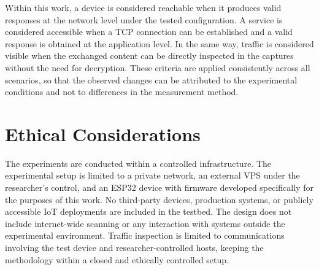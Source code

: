 Within this work, a device is considered reachable when it produces valid responses at the network level under the tested configuration. A service is considered accessible when a TCP connection can be established and a valid response is obtained at the application level. In the same way, traffic is considered visible when the exchanged content can be directly inspected in the captures without the need for decryption. These criteria are applied consistently across all scenarios, so that the observed changes can be attributed to the experimental conditions and not to differences in the measurement method.

\section{Ethical Considerations}\label{sec:ethical-considerations} 
The experiments are conducted within a controlled infrastructure. The experimental setup is limited to a private network, an external VPS under the researcher’s control, and an ESP32 device with firmware developed specifically for the purposes of this work. No third-party devices, production systems, or publicly accessible IoT deployments are included in the testbed. The design does not include internet-wide scanning or any interaction with systems outside the experimental environment. Traffic inspection is limited to communications involving the test device and researcher-controlled hosts, keeping the methodology within a closed and ethically controlled setup. 
